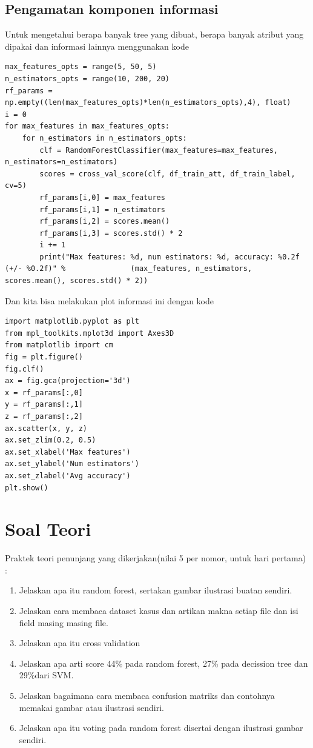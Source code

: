 \subsection{Pengamatan komponen informasi}
Untuk mengetahui berapa banyak tree yang dibuat, berapa banyak atribut yang dipakai dan informasi lainnya menggunakan kode
\begin{lstlisting}[caption=Melakukan Pengamatan komponen informasi,label={lst:3.24}]
max_features_opts = range(5, 50, 5)
n_estimators_opts = range(10, 200, 20)
rf_params = np.empty((len(max_features_opts)*len(n_estimators_opts),4), float)
i = 0
for max_features in max_features_opts:
    for n_estimators in n_estimators_opts:
        clf = RandomForestClassifier(max_features=max_features, n_estimators=n_estimators)
        scores = cross_val_score(clf, df_train_att, df_train_label, cv=5)
        rf_params[i,0] = max_features
        rf_params[i,1] = n_estimators
        rf_params[i,2] = scores.mean()
        rf_params[i,3] = scores.std() * 2
        i += 1
        print("Max features: %d, num estimators: %d, accuracy: %0.2f (+/- %0.2f)" %               (max_features, n_estimators, scores.mean(), scores.std() * 2))

\end{lstlisting}
Dan kita bisa melakukan plot informasi ini dengan kode
\begin{lstlisting}[caption=Plot Komponen informasi agar bisa dibaca,label={lst:3.25}]
import matplotlib.pyplot as plt
from mpl_toolkits.mplot3d import Axes3D
from matplotlib import cm
fig = plt.figure()
fig.clf()
ax = fig.gca(projection='3d')
x = rf_params[:,0]
y = rf_params[:,1]
z = rf_params[:,2]
ax.scatter(x, y, z)
ax.set_zlim(0.2, 0.5)
ax.set_xlabel('Max features')
ax.set_ylabel('Num estimators')
ax.set_zlabel('Avg accuracy')
plt.show()
\end{lstlisting}




\section{Soal Teori}
Praktek teori penunjang yang dikerjakan(nilai 5 per nomor, untuk hari pertama) :
\begin{enumerate}
    \item
          Jelaskan apa itu random forest, sertakan gambar ilustrasi buatan sendiri.
    \item
          Jelaskan cara membaca dataset kasus dan artikan makna setiap file dan isi field masing masing file.
    \item
          Jelaskan apa itu cross validation
    \item
          Jelaskan apa arti score 44\% pada random forest, 27\% pada decission tree dan 29\%dari SVM.
    \item
          Jelaskan bagaimana cara membaca confusion matriks dan contohnya memakai gambar atau ilustrasi sendiri.
    \item
          Jelaskan apa itu voting pada random forest disertai dengan ilustrasi gambar sendiri.
\end{enumerate}

